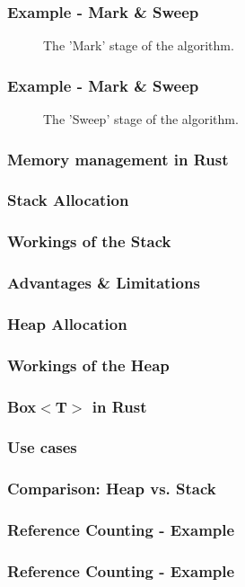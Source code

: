 \documentclass{beamer}
\begin{document}
	\begin{frame}
		\frametitle{Example - Mark \& Sweep}
		\begin{figure}
			\centering
			\def\svgwidth{230pt}
			
			\caption{The 'Mark' stage of the algorithm.}
		\end{figure}
	\end{frame}
	\begin{frame}
		\frametitle{Example - Mark \& Sweep}
		\begin{figure}
			\centering
			\def\svgwidth{230pt}
			
			\caption{The 'Sweep' stage of the algorithm.}
		\end{figure}
	\end{frame}
	\begin{frame}
		\frametitle{Memory management in Rust}
	\end{frame}
	\begin{frame}
		\frametitle{Stack Allocation}
		\begin{figure}
			
		\end{figure}
	\end{frame}
	\begin{frame}
		\frametitle{Workings of the Stack}
	\end{frame}
	\begin{frame}
		\frametitle{Advantages \& Limitations}
	\end{frame}
	\begin{frame}
		\frametitle{Heap Allocation}
	\end{frame}
	\begin{frame}
		\frametitle{Workings of the Heap}
	\end{frame}
	\begin{frame}
		\frametitle{Box$<$T$>$ in Rust}
	\end{frame}
	\begin{frame}
		\frametitle{Use cases}
	\end{frame}
	\begin{frame}
		\frametitle{Comparison: Heap vs. Stack}
	\end{frame}
	\begin{frame}
		\frametitle{Reference Counting - Example}
		\begin{figure}
			\def\svgwidth{230pt}
			\huge
			
		\end{figure}
	\end{frame}
	\begin{frame}
		\frametitle{Reference Counting - Example}
		\begin{figure}
			\def\svgwidth{230pt}
			\huge
			
		\end{figure}
	\end{frame}
\end{document}
